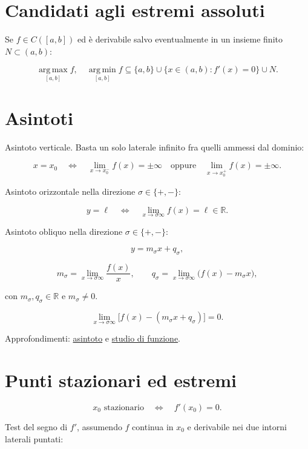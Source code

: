 \section{Candidati agli estremi assoluti}\label{candidati-agli-estremi-assoluti}

Se \(f\in C([a,b])\) ed è derivabile salvo eventualmente in un insieme finito \(N\subset(a,b)\):

\[
\operatorname*{arg\,max}_{[a,b]} f,\quad
\operatorname*{arg\,min}_{[a,b]} f
\subseteq
\{a,b\}\cup\{x\in(a,b):f'(x)=0\}\cup N.
\]

\section{Asintoti}\label{asintoti}

Asintoto verticale. Basta un solo laterale infinito fra quelli ammessi dal dominio:

\[
\displaystyle
x=x_0
\quad\Longleftrightarrow\quad
\lim_{x\to x_0^-}f(x)=\pm\infty
\quad\text{oppure}\quad
\lim_{x\to x_0^+}f(x)=\pm\infty.
\]

Asintoto orizzontale nella direzione \(\sigma\in\{+,-\}\):

\[
\displaystyle
y=\ell
\quad\Longleftrightarrow\quad
\lim_{x\to\sigma\infty}f(x)=\ell\in\mathbb R.
\]

Asintoto obliquo nella direzione \(\sigma\in\{+,-\}\):

\[
\displaystyle
y=m_\sigma x+q_\sigma,
\]

\[
\displaystyle
m_\sigma=\lim_{x\to\sigma\infty}\frac{f(x)}{x},
\qquad
q_\sigma=\lim_{x\to\sigma\infty}\bigl(f(x)-m_\sigma x\bigr),
\]

con \(m_\sigma,q_\sigma\in\mathbb R\) e \(m_\sigma\ne0\).

\[
\displaystyle
\lim_{x\to\sigma\infty}
\bigl[f(x)-(m_\sigma x+q_\sigma)\bigr]=0.
\]

Approfondimenti: \href{https://ingegnerismo.it/matematica/asintoto/}{asintoto} e \href{https://ingegnerismo.it/matematica/studio-di-funzione/}{studio di funzione}.

\section{Punti stazionari ed estremi}\label{punti-stazionari-ed-estremi}

\[
\displaystyle
x_0\text{ stazionario}
\quad\Longleftrightarrow\quad
f'(x_0)=0.
\]

Test del segno di \(f'\), assumendo \(f\) continua in \(x_0\) e derivabile nei due intorni laterali puntati:

